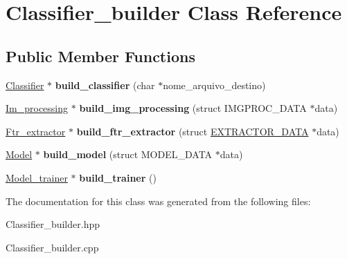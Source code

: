 \hypertarget{class_classifier__builder}{\section{Classifier\+\_\+builder Class Reference}
\label{class_classifier__builder}
}
\subsection*{Public Member Functions}
\begin{DoxyCompactItemize}
\item 
\hypertarget{class_classifier__builder_a6363ae941436f1695a92c4f5d39228b9}{\hyperlink{class_classifier}{Classifier} $\ast$ {\bfseries build\+\_\+classifier} (char $\ast$nome\+\_\+arquivo\+\_\+destino)}\label{class_classifier__builder_a6363ae941436f1695a92c4f5d39228b9}

\item 
\hypertarget{class_classifier__builder_a2f0abc6ac39190073e3e4ff62f96d152}{\hyperlink{class_im__processing}{Im\+\_\+processing} $\ast$ {\bfseries build\+\_\+img\+\_\+processing} (struct I\+M\+G\+P\+R\+O\+C\+\_\+\+D\+A\+T\+A $\ast$data)}\label{class_classifier__builder_a2f0abc6ac39190073e3e4ff62f96d152}

\item 
\hypertarget{class_classifier__builder_a2e4d8aa570e6e41e75ee1d5d7aaa862a}{\hyperlink{class_ftr__extractor}{Ftr\+\_\+extractor} $\ast$ {\bfseries build\+\_\+ftr\+\_\+extractor} (struct \hyperlink{struct_e_x_t_r_a_c_t_o_r___d_a_t_a}{E\+X\+T\+R\+A\+C\+T\+O\+R\+\_\+\+D\+A\+T\+A} $\ast$data)}\label{class_classifier__builder_a2e4d8aa570e6e41e75ee1d5d7aaa862a}

\item 
\hypertarget{class_classifier__builder_aeced7c476c0031a1ac8860c7b07b054c}{\hyperlink{class_model}{Model} $\ast$ {\bfseries build\+\_\+model} (struct M\+O\+D\+E\+L\+\_\+\+D\+A\+T\+A $\ast$data)}\label{class_classifier__builder_aeced7c476c0031a1ac8860c7b07b054c}

\item 
\hypertarget{class_classifier__builder_a3efa3afcb9bdc6dc1a9771d82852120f}{\hyperlink{class_model__trainer}{Model\+\_\+trainer} $\ast$ {\bfseries build\+\_\+trainer} ()}\label{class_classifier__builder_a3efa3afcb9bdc6dc1a9771d82852120f}

\end{DoxyCompactItemize}


The documentation for this class was generated from the following files\+:\begin{DoxyCompactItemize}
\item 
Classifier\+\_\+builder.\+hpp\item 
Classifier\+\_\+builder.\+cpp\end{DoxyCompactItemize}
